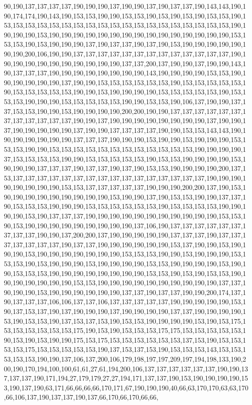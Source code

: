 90,190,137,137,137,137,190,190,190,137,190,190,137,190,137,137,190,143,143,190,190,174,174,190,143,190,153,153,190,190,153,153,190,153,190,153,190,153,153,190,153,153,153,153,153,153,153,153,153,153,153,153,153,153,153,153,153,153,153,190,190,190,190,153,190,190,190,190,190,190,190,190,190,190,190,190,190,190,190,153,153,153,190,153,190,190,190,137,190,137,137,190,137,190,153,190,190,190,190,190,190,190,200,106,190,190,137,137,137,137,137,137,137,137,137,137,137,137,137,190,190,190,190,190,190,190,190,190,190,190,137,137,200,137,190,190,137,190,190,143,190,137,137,137,190,190,190,190,190,190,190,190,143,190,190,190,190,153,153,190,190,190,190,190,190,137,190,190,153,153,153,153,153,153,190,153,153,153,153,153,190,153,153,153,153,153,190,190,153,190,190,190,190,153,153,153,153,153,190,153,153,153,190,190,190,153,153,153,153,153,190,190,153,153,190,106,137,190,190,137,137,153,153,190,190,153,190,190,190,190,200,200,190,190,137,137,137,137,137,137,137,137,137,137,137,137,190,190,137,190,190,190,190,190,190,190,190,137,190,190,137,190,190,190,190,190,137,190,190,137,137,137,137,190,190,153,153,143,143,190,190,190,190,190,190,190,137,137,137,190,190,190,153,190,190,153,190,190,190,153,153,153,190,190,153,153,153,153,153,153,153,153,153,153,153,153,190,190,190,190,137,153,153,153,153,190,190,153,153,153,153,153,190,153,153,190,190,190,190,153,190,190,190,137,137,137,190,137,137,190,137,190,153,153,190,190,190,190,200,137,153,137,137,137,137,137,137,137,137,137,137,137,137,137,137,137,137,190,190,190,190,190,190,190,190,153,153,137,137,137,137,137,190,190,190,200,200,137,190,153,190,190,190,190,190,190,190,190,190,153,190,190,137,190,153,153,190,190,137,137,190,153,153,153,190,190,190,153,153,153,153,153,153,190,153,153,153,153,190,190,190,190,153,190,137,137,137,190,190,190,190,190,190,190,190,190,190,190,153,153,190,153,190,190,190,190,190,190,190,190,190,137,106,190,137,137,137,137,137,137,137,137,137,190,190,137,200,200,137,190,190,190,190,190,137,137,137,190,137,137,137,137,137,137,137,190,137,137,190,190,190,190,190,190,153,137,190,190,153,190,190,190,153,190,190,190,190,190,190,190,153,153,153,190,190,153,190,190,190,153,153,153,190,153,190,190,190,153,190,190,190,190,153,153,190,190,190,190,153,190,190,153,153,153,190,190,190,190,190,190,190,190,153,153,190,153,190,153,153,190,190,190,190,190,190,190,153,153,190,190,190,190,190,190,190,190,190,190,137,137,190,190,190,153,190,190,190,190,190,190,137,137,190,137,137,190,190,200,174,137,190,137,137,137,106,106,137,137,106,137,137,137,137,137,190,190,190,190,190,153,190,137,153,137,190,137,190,190,190,137,190,190,190,190,137,137,190,190,190,190,153,190,153,153,190,137,153,137,153,190,153,153,190,190,190,190,153,190,153,175,153,153,153,153,153,153,175,190,153,190,153,153,153,175,175,153,153,153,153,153,190,153,190,153,190,190,175,153,175,153,153,153,153,153,153,137,153,190,153,153,153,153,175,153,153,153,153,153,190,137,153,137,153,190,153,153,153,143,153,153,153,153,153,190,190,137,106,137,200,106,179,198,197,197,209,197,194,198,133,190,200,190,170,194,100,100,61,61,27,61,194,200,106,137,137,137,137,137,137,190,190,137,137,137,190,171,194,27,179,179,27,27,194,171,137,137,190,153,190,190,190,190,153,190,137,190,63,171,66,66,66,66,170,171,67,190,190,190,40,66,63,170,170,63,63,170,66,106,137,190,137,137,190,137,66,170,66,170,66,66,